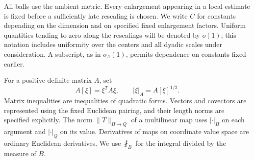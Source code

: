 All balls use the ambient metric. Every enlargement appearing in a
local estimate is fixed before a sufficiently late rescaling is
chosen. We write \(C\) for constants depending on the dimension and
on specified fixed enlargement factors. Uniform quantities tending
to zero along the rescalings will be denoted by \(o(1)\); this
notation includes uniformity over the centers and all dyadic scales
under consideration. A subscript, as in \(o_A(1)\), permits
dependence on constants fixed earlier.

For a positive definite matrix \(A\), set
\[
 A[\xi]=\xi^T A\xi,\qquad |\xi|_A=A[\xi]^{1/2}.
\]
Matrix inequalities are inequalities of quadratic forms. Vectors
and covectors are represented using the fixed Euclidean pairing,
and their length norms are specified explicitly. The norm
\(\|T\|_{H\to Q}\) of a multilinear map uses \(|\cdot|_H\) on each
argument and \(|\cdot|_Q\) on its value. Derivatives of maps on
coordinate value space are ordinary Euclidean derivatives. We use
\(\fint_B\) for the integral divided by the measure of \(B\).
